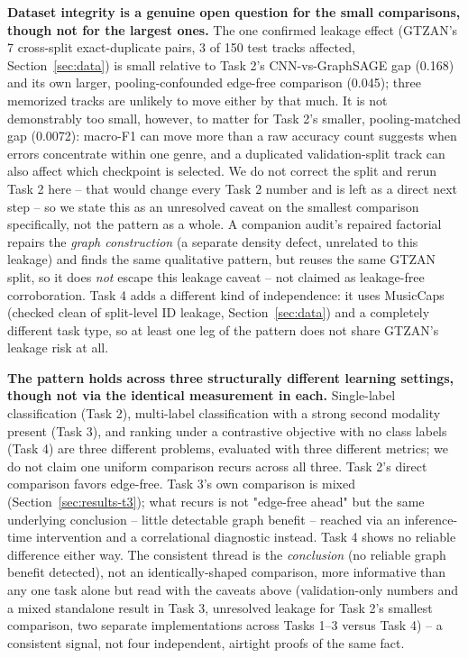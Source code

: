 \textbf{Dataset integrity is a genuine open question for the small comparisons, though not
for the largest ones.} The one confirmed leakage effect (GTZAN's 7 cross-split exact-duplicate pairs, 3 of 150 test
tracks affected, Section~\ref{sec:data}) is small relative to Task 2's CNN-vs-GraphSAGE gap
(0.168) and its own larger, pooling-confounded edge-free comparison (0.045); three memorized
tracks are unlikely to move either by that much. It is not demonstrably too small, however,
to matter for Task 2's smaller, pooling-matched gap (0.0072): macro-F1 can move more than a
raw accuracy count suggests when errors concentrate within one genre, and a duplicated
validation-split track can also affect which checkpoint is selected. We do not correct the
split and rerun Task 2 here -- that would change every Task 2 number and is left as a direct
next step -- so we state this as an unresolved caveat on the smallest comparison
specifically, not the pattern as a whole. A companion audit's repaired factorial
\cite{tismir_audit} repairs the \emph{graph construction} (a separate density defect,
unrelated to this leakage) and finds the same qualitative pattern, but reuses the same GTZAN
split, so it does \emph{not} escape this leakage caveat -- not claimed as leakage-free
corroboration. Task 4 adds a different kind of independence: it uses MusicCaps (checked clean
of split-level ID leakage, Section~\ref{sec:data}) and a completely different task type, so at
least one leg of the pattern does not share GTZAN's leakage risk at all.

\textbf{The pattern holds across three structurally different learning settings, though not
via the identical measurement in each.} Single-label classification (Task 2), multi-label classification with a strong second
modality present (Task 3), and ranking under a contrastive objective with no class labels
(Task 4) are three different problems, evaluated with three different metrics; we do not
claim one uniform comparison recurs across all three. Task 2's direct comparison favors
edge-free. Task 3's own comparison is mixed (Section~\ref{sec:results-t3}); what recurs is
not "edge-free ahead" but the same underlying conclusion -- little detectable graph
benefit -- reached via an inference-time intervention and a correlational diagnostic instead.
Task 4 shows no reliable difference either way. The consistent thread is the
\emph{conclusion} (no reliable graph benefit detected), not an identically-shaped comparison,
more informative than any one task alone but read with the caveats above (validation-only
numbers and a mixed standalone result in Task 3, unresolved leakage for Task 2's smallest
comparison, two separate implementations across Tasks 1--3 versus Task 4) -- a consistent
signal, not four independent, airtight proofs of the same fact.
